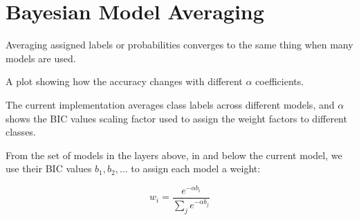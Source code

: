 \documentclass[a4paper,12pt ]{report}
\begin{document}
\clearpage

\section{Bayesian Model Averaging}

Averaging assigned labels or probabilities converges to the same thing when many models are used. 

A plot showing how the accuracy changes with different $\alpha$ coefficients. 

The current implementation averages class labels across different models, and $\alpha$ shows the BIC values scaling factor used to assign the weight factors to different classes. 

From the set of models in the layers above, in and below the current model, we use their BIC values $b_1, b_2, \ldots $ to assign each model a weight:

\begin{equation*} w_i = \frac{e^{- \alpha b_i}}{ \sum_{j}{ e^{- \alpha b_j} } }  \end{equation*}
\end{document}
